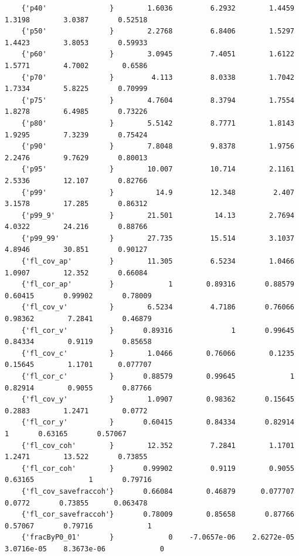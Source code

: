 \documentclass[
]{book}
\begin{document}
\begin{verbatim}
    {'p40'               }        1.6036         6.2932        1.4459        1.3198        3.0387       0.52518 
    {'p50'               }        2.2768         6.8406        1.5297        1.4423        3.8053       0.59933 
    {'p60'               }        3.0945         7.4051        1.6122        1.5771        4.7002        0.6586 
    {'p70'               }         4.113         8.0338        1.7042        1.7334        5.8225       0.70999 
    {'p75'               }        4.7604         8.3794        1.7554        1.8278        6.4985       0.73226 
    {'p80'               }        5.5142         8.7771        1.8143        1.9295        7.3239       0.75424 
    {'p90'               }        7.8048         9.8378        1.9756        2.2476        9.7629       0.80013 
    {'p95'               }        10.007         10.714        2.1161        2.5336        12.107       0.82766 
    {'p99'               }          14.9         12.348         2.407        3.1578        17.285       0.86312 
    {'p99_9'             }        21.501          14.13        2.7694        4.0322        24.216       0.88766 
    {'p99_99'            }        27.735         15.514        3.1037        4.8946        30.851       0.90127 
    {'fl_cov_ap'         }        11.305         6.5234        1.0466        1.0907        12.352       0.66084 
    {'fl_cor_ap'         }             1        0.89316       0.88579       0.60415       0.99902       0.78009 
    {'fl_cov_v'          }        6.5234         4.7186       0.76066       0.98362        7.2841       0.46879 
    {'fl_cor_v'          }       0.89316              1       0.99645       0.84334        0.9119       0.85658 
    {'fl_cov_c'          }        1.0466        0.76066        0.1235       0.15645        1.1701      0.077707 
    {'fl_cor_c'          }       0.88579        0.99645             1       0.82914        0.9055       0.87766 
    {'fl_cov_y'          }        1.0907        0.98362       0.15645        0.2883        1.2471        0.0772 
    {'fl_cor_y'          }       0.60415        0.84334       0.82914             1       0.63165       0.57067 
    {'fl_cov_coh'        }        12.352         7.2841        1.1701        1.2471        13.522       0.73855 
    {'fl_cor_coh'        }       0.99902         0.9119        0.9055       0.63165             1       0.79716 
    {'fl_cov_savefraccoh'}       0.66084        0.46879      0.077707        0.0772       0.73855      0.063478 
    {'fl_cor_savefraccoh'}       0.78009        0.85658       0.87766       0.57067       0.79716             1 
    {'fracByP0_01'       }             0    -7.0657e-06    2.6272e-05    3.0716e-05    8.3673e-06             0 

\end{verbatim}
\end{document}
